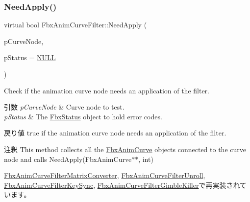 \subsubsection{\texorpdfstring{Need\+Apply()}{NeedApply()}\hspace{0.1cm}{\footnotesize\ttfamily [3/5]}}
{\footnotesize\ttfamily virtual bool Fbx\+Anim\+Curve\+Filter\+::\+Need\+Apply (\begin{DoxyParamCaption}\item[{\hyperlink{class_fbx_anim_curve_node}{Fbx\+Anim\+Curve\+Node} \&}]{p\+Curve\+Node,  }\item[{\hyperlink{class_fbx_status}{Fbx\+Status} $\ast$}]{p\+Status = {\ttfamily \hyperlink{fbxarch_8h_a070d2ce7b6bb7e5c05602aa8c308d0c4}{N\+U\+LL}} }\end{DoxyParamCaption})\hspace{0.3cm}{\ttfamily [virtual]}}

Check if the animation curve node needs an application of the filter. 
\begin{DoxyParams}{引数}
{\em p\+Curve\+Node} & Curve node to test. \\
\hline
{\em p\+Status} & The \hyperlink{class_fbx_status}{Fbx\+Status} object to hold error codes. \\
\hline
\end{DoxyParams}
\begin{DoxyReturn}{戻り値}
{\ttfamily true} if the animation curve node needs an application of the filter. 
\end{DoxyReturn}
\begin{DoxyRemark}{注釈}
This method collects all the \hyperlink{class_fbx_anim_curve}{Fbx\+Anim\+Curve} objects connected to the curve node and calls Need\+Apply(\+Fbx\+Anim\+Curve$\ast$$\ast$, int) 
\end{DoxyRemark}


\hyperlink{class_fbx_anim_curve_filter_matrix_converter_a00f04a303254479eef1aa3bfbe0643d8}{Fbx\+Anim\+Curve\+Filter\+Matrix\+Converter}, \hyperlink{class_fbx_anim_curve_filter_unroll_ad3df0b89af14237342197a8832e3d94f}{Fbx\+Anim\+Curve\+Filter\+Unroll}, \hyperlink{class_fbx_anim_curve_filter_key_sync_a72cb983cb554a070688eb0990d4b7576}{Fbx\+Anim\+Curve\+Filter\+Key\+Sync}, \hyperlink{class_fbx_anim_curve_filter_gimble_killer_a72a761452f1a110353be0b6cae920e24}{Fbx\+Anim\+Curve\+Filter\+Gimble\+Killer}で再実装されています。

\mbox{\label{class_fbx_anim_curve_filter_a6b210eca45b745cf070c46bfaaf3e5b2}} 

